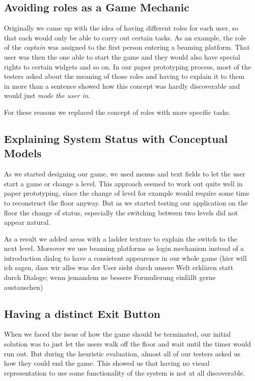 \documentclass{sigchi}
\begin{document}
\subsection{Avoiding roles as a Game Mechanic}
\vspace{1mm}
Originally we came up with the idea of having different roles for each user, so that each would only be able to carry out certain tasks. As an example, the role of the \textit{captain} was assigned to the first person entering a beaming platform. That user was then the one able to start the game and they would also have special rights to certain widgets and so on. In our paper prototyping process, most of the testers asked about the meaning of those roles and having to explain it to them in more than a sentence showed how this concept was hardly discoverable and would just \textit{mode the user in}.

For these reasons we replaced the concept of roles with more specific tasks.

\subsection{Explaining System Status with Conceptual Models}
\vspace{1mm}
As we started designing our game, we used menus and text fields to let the user start a game or change a level. This approach seemed to work out quite well in paper prototyping, since the change of level for example would require some time to reconstruct the floor anyway. But as we started testing our application on the floor the change of status, especially the switching between two levels did not appear natural. 

As a result we added areas with a ladder texture to explain the switch to the next level. Moreover we use beaming platforms as login mechanism instead of a introduction dialog to have a consistent appearence in our whole game (hier will ich sagen, dass wir alles was der User sieht durch unsere Welt erklären statt durch Dialoge; wenn jemandem ne bessere Formulierung einfällt gerne austauschen)

\subsection{Having a distinct Exit Button}
\vspace{1mm}
When we faced the issue of how the game should be terminated, our initial solution was to just let the users walk off the floor and wait until the timer would run out. But during the heuristic evaluation, almost all of our testers asked us how they could end the game. This showed us that having no visual representation to use some functionality of the system is not at all discoverable. 
\end{document}

